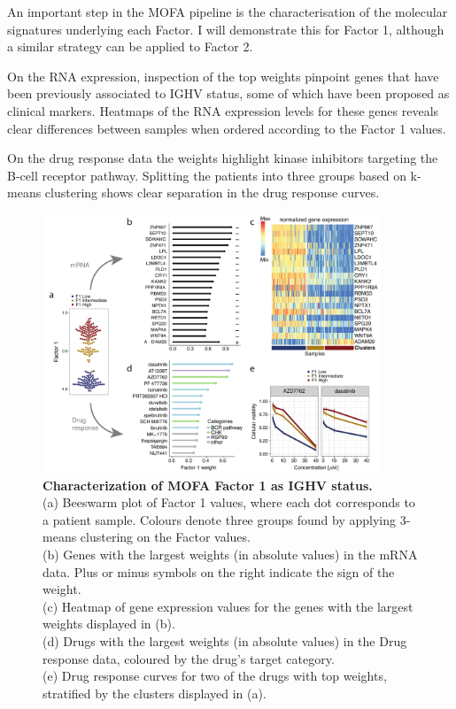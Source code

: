 An important step in the MOFA pipeline is the characterisation of the molecular signatures underlying each Factor. I will demonstrate this for Factor 1, although a similar strategy can be applied to Factor 2.

On the RNA expression, inspection of the top weights pinpoint genes that have been previously associated to IGHV status, some of which have been proposed as clinical markers\cite{Vasconcelos2005,Morabito2015}. Heatmaps of the RNA expression levels for these genes reveals clear differences between samples when ordered according to the Factor 1 values.

On the drug response data the weights highlight kinase inhibitors targeting the B-cell receptor pathway. Splitting the patients into three groups based on k-means clustering shows clear separation in the drug response curves.

\begin{figure}[H]
	\centering 	
	\includegraphics[width=0.90\textwidth]{MOFA_CLL_Factor1}
	\caption{
	\textbf{Characterization of MOFA Factor 1 as IGHV status.}\\
	(a) Beeswarm plot of Factor 1 values, where each dot corresponds to a patient sample. Colours denote three groups found by applying 3-means clustering on the Factor values.\\
	(b) Genes with the largest weights (in absolute values) in the mRNA data. Plus or minus symbols on the right indicate the sign of the weight.\\
	(c) Heatmap of gene expression values for the genes with the largest weights displayed in (b).\\
	(d) Drugs with the largest weights (in absolute values) in the Drug response data, coloured by the drug's target category.\\
	(e) Drug response curves for two of the drugs with top weights, stratified by the clusters displayed in (a).
	}
	\label{fig:MOFA_CLL_Factor1}
\end{figure}

